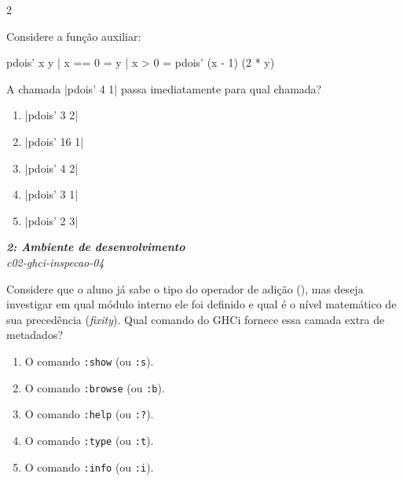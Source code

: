 \documentclass[a4paper,10pt,brazil]{article}
\begin{document}
\begin{multicols}{2}
\begin{flushright}
\end{flushright}
Considere a função auxiliar:
\begin{haskellcode}
pdois' x y
  | x == 0 = y
  | x > 0  = pdois' (x - 1) (2 * y)
\end{haskellcode}
A chamada \haskellinline|pdois' 4 1| passa imediatamente para qual chamada?

\begin{enumerate}
  \item \haskellinline|pdois' 3 2|

  \item \haskellinline|pdois' 16 1|

  \item \haskellinline|pdois' 4 2|

  \item \haskellinline|pdois' 3 1|

  \item \haskellinline|pdois' 2 3|


\end{enumerate}

\begin{flushright}
  \footnotesize
  \textit{\textbf{2: Ambiente de desenvolvimento}}\\
  \textit{c02-ghci-inspecao-04}\\

\end{flushright}
Considere que o aluno já sabe o tipo do operador de adição (\haskellinline{+}), mas deseja investigar em qual módulo interno ele foi definido e qual é o nível matemático de sua precedência (\emph{fixity}). Qual comando do GHCi fornece essa camada extra de metadados?

\begin{enumerate}
  \item O comando \texttt{:show} (ou \texttt{:s}).

  \item O comando \texttt{:browse} (ou \texttt{:b}).

  \item O comando \texttt{:help} (ou \texttt{:?}).

  \item O comando \texttt{:type} (ou \texttt{:t}).

  \item O comando \texttt{:info} (ou \texttt{:i}).


\end{enumerate}


\end{multicols}
\end{document}
